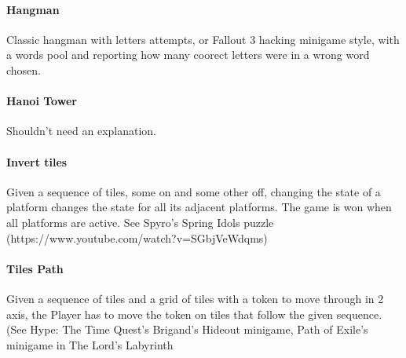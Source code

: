 \paragraph{Hangman} Classic hangman with letters attempts, or Fallout 3 hacking minigame style, with a words pool and reporting how many coorect letters were in a wrong word chosen.

\paragraph{Hanoi Tower} Shouldn't need an explanation.

\paragraph{Invert tiles} Given a sequence of tiles, some on and some other off, changing the state of a platform changes the state for all its adjacent platforms. The game is won when all platforms are active. See Spyro's Spring Idols puzzle (https://www.youtube.com/watch?v=SGbjVeWdqms)


\paragraph{Tiles Path} Given a sequence of tiles and a grid of tiles with a token to move through in 2 axis, the Player has to move the token on tiles that follow the given sequence. (See Hype: The Time Quest's Brigand's Hideout minigame, Path of Exile's minigame in The Lord's Labyrinth

